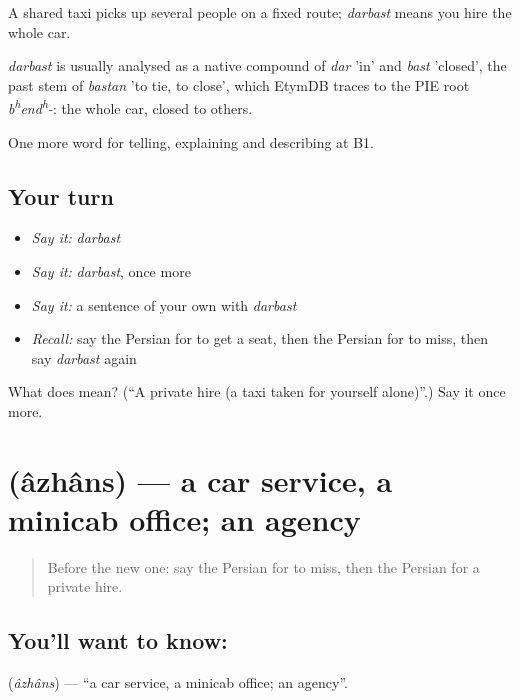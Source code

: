 A shared taxi picks up several people on a fixed route; \emph{darbast} means you hire the whole car.

\begin{cousinweb}
\emph{darbast} is usually analysed as a native compound of \emph{dar} 'in' and \emph{bast} 'closed', the past stem of \emph{bastan} 'to tie, to close', which EtymDB traces to the PIE root \emph{b\textsuperscript{h}end\textsuperscript{h}-}: the whole car, closed to others.
\end{cousinweb}

\begin{grammarlens}[title={What you've built}]
One more word for telling, explaining and describing at B1.
\end{grammarlens}

\subsection*{Your turn}
\begin{itemize}
\raggedright
  \item \emph{Say it:} \emph{darbast}
  \item \emph{Say it:} \emph{darbast}, once more
  \item \emph{Say it:} a sentence of your own with \emph{darbast}
  \item \emph{Recall:} say the Persian for to get a seat, then the Persian for to miss, then say \emph{darbast} again
\end{itemize}

\begin{tcolorbox}[breakable,colback=teal!4,colframe=teal!35!black,title={Before you move on}]
What does  mean? (\textquotedblleft{}A private hire (a taxi taken for yourself alone)\textquotedblright{}.) Say it once more.
\end{tcolorbox}
\section[\texorpdfstring{\fa{آژانس} (âzhâns)}{آژانس (âzhâns)}]{ (âzhâns) — a car service, a minicab office; an agency}

\label{lesson:FA-C435-azhans}



\begin{quote}
Before the new one: say the Persian for to miss, then the Persian for a private hire.
\end{quote}

\subsection*{You'll want to know: }
\textbf{} (\emph{âzhâns}) — \textquotedblleft{}a car service, a minicab office; an agency\textquotedblright{}.

